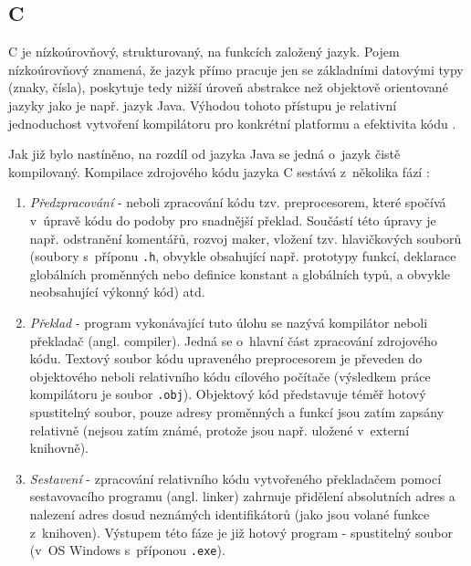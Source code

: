 \documentclass{bakalarka}
\begin{document}
\subsection{C}
C je nízkoúrovňový, strukturovaný, na funkcích založený jazyk. Pojem nízkoúrovňový znamená, že jazyk přímo pracuje jen se základními datovými typy (znaky, čísla), poskytuje tedy nižší úroveň abstrakce než objektově orientované jazyky jako je např. jazyk Java. Výhodou tohoto přístupu je relativní jednoduchost vytvoření kompilátoru pro konkrétní platformu a efektivita kódu \cite{c-book, c-guide}.\par
Jak již bylo nastíněno, na rozdíl od jazyka Java se jedná o~jazyk čistě kompilovaný. Kompilace zdrojového kódu jazyka C sestává z~několika fází \cite{c-book, c-guide}:
\begin{enumerate}
\item \textit{Předzpracování} - neboli zpracování kódu tzv. preprocesorem, které spočívá v~úpravě kódu do podoby pro snadnější překlad. Součástí této úpravy je např. odstranění komentářů, rozvoj maker, vložení tzv. hlavičkových souborů (soubory s~příponu \texttt{.h}, obvykle obsahující např. prototypy funkcí, deklarace globálních proměnných nebo definice konstant a globálních typů, a obvykle neobsahující výkonný kód) atd.
\item \textit{Překlad} - program vykonávající tuto úlohu se nazývá kompilátor neboli překladač (angl. compiler). Jedná se o~hlavní část zpracování zdrojového kódu. Textový soubor kódu upraveného preprocesorem je převeden do objektového neboli relativního kódu cílového počítače (výsledkem práce kompilátoru je soubor \texttt{.obj}). Objektový kód představuje téměř hotový spustitelný soubor, pouze adresy proměnných a funkcí jsou zatím zapsány relativně (nejsou zatím známé, protože jsou např. uložené v~externí knihovně).
\item \textit{Sestavení} - zpracování relativního kódu vytvořeného překladačem pomocí sestavovacího programu (angl. linker) zahrnuje přidělení absolutních adres a nalezení adres dosud neznámých identifikátorů (jako jsou volané funkce z~knihoven). Výstupem této fáze je již hotový program - spustitelný soubor (v~OS Windows s~příponou \texttt{.exe}).
\end{enumerate}\par\noindent
\end{document}
